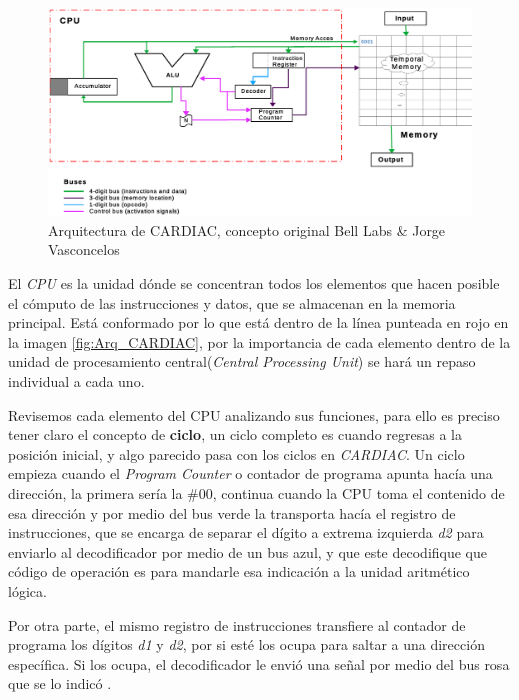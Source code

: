\documentclass[letterpaper,12pt,oneside]{book}
\begin{document}
	\begin{figure}[ht]
 			\centering
			\includegraphics[scale=0.5]{media/CARDIACC/Arquitectura_diagrama_original.eps}
			\caption{Arquitectura de CARDIAC, concepto original Bell Labs \& Jorge Vasconcelos}
			\label{fig:Arquitectura_diagrama_original}
	\end{figure}
	
	
	
	El \textit{CPU} es la unidad dónde se concentran todos los elementos que hacen posible el cómputo de las instrucciones y datos,
	que se almacenan en la memoria principal.
	Está conformado por lo que está dentro de la línea punteada en rojo en la imagen \ref{fig:Arq_CARDIAC}, por la importancia
	de cada elemento dentro de la unidad de procesamiento central(\textit{Central Processing Unit}) se hará un repaso individual a cada uno.
	
	Revisemos cada elemento del CPU analizando sus funciones, para ello es preciso tener claro el concepto de \textbf{ciclo}, un
	ciclo completo es cuando regresas a la posición inicial, y algo parecido pasa con los ciclos en \textit{CARDIAC}. Un ciclo empieza
	cuando el \textit{Program Counter} o contador de programa apunta hacía una dirección, la primera sería la \#00, continua
	cuando la CPU toma el contenido de esa dirección y por medio del bus verde la transporta hacía el 
	registro de instrucciones, que se encarga de separar el dígito a extrema izquierda \textit{d2} para enviarlo al decodificador
	por medio de un bus azul, y que este decodifique que código de operación es para mandarle esa indicación a la 
	unidad aritmético lógica\cite{fingerman_instruction_1968}. 
 
    Por otra parte, el mismo registro de instrucciones transfiere al contador de programa los dígitos \textit{d1} y \textit{d2},
	por si esté los ocupa para saltar a una dirección específica. Si los ocupa, el decodificador le envió una señal por medio 
	del bus rosa que se lo indicó \cite{fingerman_instruction_1968}.
	
\end{document}
